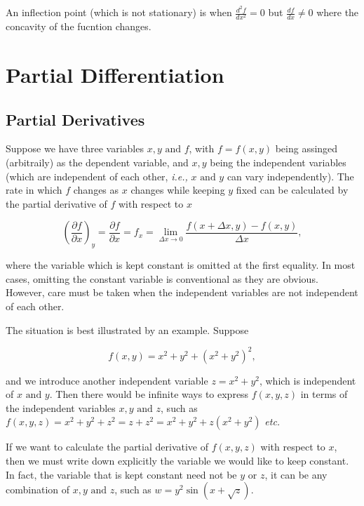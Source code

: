 \documentclass[english,a4paper,12pt]{report}
\begin{document}
An inflection point (which is not stationary) is when \(\displaystyle \frac{d^2f}{dx^2} = 0\) but \(\displaystyle \frac{df}{dx} \neq 0\) where the concavity of the fucntion changes.  

\section{Partial Differentiation}

\subsection{Partial Derivatives}

Suppose we have three variables \(x,y \text { and } f\), with \(f = f(x,y)\) being assinged (arbitraily) as the dependent variable, and \(x,y\) being the independent variables (which are independent of each other, \textit{i.e.,} \(x \text { and } y\) can vary independently). The rate in which \(f\) changes as \(x\) changes while keeping \(y\) fixed can be calculated by the partial derivative of \(f\) with respect to \(x\)

\begin{equation}
    \left( \frac{\partial f}{\partial x} \right)_{y} = \frac{\partial f}{\partial x} = f_{x}  = \lim_{\Delta x \to 0} \frac{f(x+\Delta x,y) - f(x,y)}{\Delta x},
\end{equation}

where the variable which is kept constant is omitted at the first equality. In most cases, omitting the constant variable is conventional as they are obvious. However, care must be taken when the independent variables are not independent of each other. 

The situation is best illustrated by an example. Suppose

\begin{equation}
	f(x,y) = x^2+y^2+(x^2+y^2)^2,
\end{equation}

and we introduce another independent variable \(z = x^2+y^2\), which is independent of \(x \text { and } y\). Then there would be infinite ways to express \(f(x,y,z)\) in terms of the independent variables \(x,y \text { and } z\), such as \(f(x,y,z) = x^2+y^2+z^2 = z+z^2 = x^2+y^2+z(x^2+y^2)\) \textit{etc.} 

If we want to calculate the partial derivative of \(f(x,y,z)\) with respect to \(x\), then we must write down explicitly the variable we would like to keep constant. In fact, the variable that is kept constant need not be \(y \text { or } z\), it can be any combination of \(x,y \text { and } z\), such as \(w = y^2\sin (x+\sqrt{z} )\). 
\end{document}
